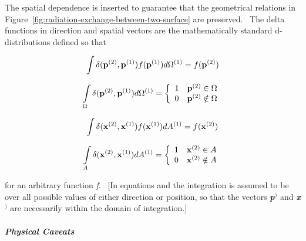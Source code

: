 The spatial dependence is inserted to guarantee that the geometrical relations in Figure~\ref{fig:radiation-exchange-between-two-surface} are preserved.~ The delta functions in direction and spatial vectors are the mathematically standard d-distributions defined so that

\begin{equation}
\int {\delta ({{\bf{p}}^{{\rm{(2)}}}},{{\bf{p}}^{{\rm{(1)}}}})} f({{\bf{p}}^{{\rm{(1)}}}})d{\Omega ^{{\rm{(1)}}}} = f({{\bf{p}}^{{\rm{(2)}}}})
\end{equation}

\begin{equation}
\int\limits_\Omega  {\delta ({{\bf{p}}^{{\rm{(2)}}}},{{\bf{p}}^{{\rm{(1)}}}})d{\Omega ^{{\rm{(1)}}}}}  = \left\{ {\begin{array}{*{20}{c}}1&{{{\bf{p}}^{{\rm{(2)}}}} \in \Omega }\\0&{{{\bf{p}}^{{\rm{(2)}}}} \notin \Omega }\end{array}} \right.
\end{equation}

\begin{equation}
\int {\delta ({{\bf{x}}^{{\rm{(2)}}}},{{\bf{x}}^{{\rm{(1)}}}})} f({{\bf{x}}^{{\rm{(1)}}}})d{A^{{\rm{(1)}}}} = f({{\bf{x}}^{{\rm{(2)}}}})
\end{equation}

\begin{equation}
\int\limits_A {\delta ({{\bf{x}}^{{\rm{(2)}}}},{{\bf{x}}^{{\rm{(1)}}}})d{A^{{\rm{(1)}}}}}  = \left\{ {\begin{array}{*{20}{c}}1&{{{\bf{x}}^{{\rm{(2)}}}} \in A}\\0&{{{\bf{x}}^{{\rm{(2)}}}} \notin A}\end{array}} \right.
\end{equation}

for an arbitrary function \emph{f}.~ {[}In equations and the integration is assumed to be over all possible values of either direction or position, so that the vectors \textbf{\emph{p}}\(^{)}\) and \textbf{\emph{x}}\(^{)}\) are necessarily within the domain of integration.{]}

\subparagraph{Physical Caveats}\label{physical-caveats}

